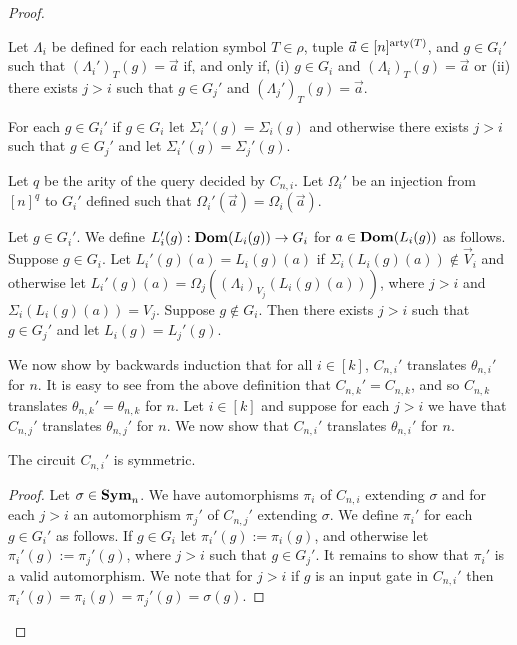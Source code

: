 \documentclass[../main/thesis.tex]{subfiles}
\begin{document}
\begin{proof}
\begin{myitemize}
  \item Let $\Lambda_i$ be defined for each relation symbol $T \in \rho$, tuple
    $\vec{a} \in [n]^{\mathrm{arty}(T)}$, and $g \in G_i'$ such that $(\Lambda_i')_{T}
    (g) = \vec{a}$ if, and only if, (i) $g \in G_i$ and $(\Lambda_i)_{T}(g) =
    \vec{a}$ or (ii) there exists $j > i$ such that $g \in G_j'$ and
    $(\Lambda_j')_T (g) = \vec{a}$.
    
  \item For each $g \in G_i'$ if $g \in G_i$ let $\Sigma_i' (g) = \Sigma_i (g)$
    and otherwise there exists $j > i$ such that $g \in G_j'$ and let $\Sigma_i'
    (g) = \Sigma_j' (g)$.
    
  \item Let $q$ be the arity of the query decided by $C_{n, i}$. Let $\Omega_i'$
    be an injection from $[n]^{q}$ to $G_i'$ defined such that $\Omega_i'
    (\vec{a}) = \Omega_i(\vec{a})$.
    
  \item Let $g \in G_i'$. We define $L_i' (g) : \text{\textbf{Dom}} (L_i(g)) \rightarrow G_i$ for $a
    \in \text{\textbf{Dom}}(L_i(g))$ as follows. Suppose $g \in G_i$. Let $L_i' (g)(a) =
    L_i(g)(a)$ if $\Sigma_i (L_i (g)(a)) \not\in \vec{V}_i$ and otherwise let
    $L_i'(g)(a) = \Omega_j((\Lambda_i)_{V_j}(L_i(g)(a)))$, where $j > i$ and
    $\Sigma_i (L_i (g)(a)) = V_j$. Suppose $g \not\in G_i$. Then there exists $j
    > i$ such that $g \in G_j'$ and let $L_i(g) = L_j'(g)$.
  \end{myitemize}
  
  We now show by backwards induction that for all $i \in [k]$, $C_{n, i}'$
  translates $\theta_{n, i}'$ for $n$. It is easy to see from the above
  definition that $C_{n, k}' = C_{n, k}$, and so $C_{n, k}$ translates
  $\theta_{n, k}' = \theta_{n, k}$ for $n$. Let $i \in [k]$ and suppose for each
  $j > i$ we have that $C_{n, j}'$ translates $\theta_{n, j}'$ for $n$. We now
  show that $C_{n, i}'$ translates $\theta_{n, i}'$ for $n$.

\begin{claim}
  The circuit $C_{n, i}'$ is symmetric.
\end{claim}
\begin{proof}
  Let $\sigma \in \text{\textbf{Sym}}_n$. We have automorphisms $\pi_i$ of $C_{n, i}$ extending
  $\sigma$ and for each $j > i$ an automorphism $\pi_j'$ of $C_{n, j}'$
  extending $\sigma$. We define $\pi_i'$ for each $g \in G_i'$ as follows. If $g
  \in G_i$ let $\pi_i' (g) := \pi_i (g)$, and otherwise let $\pi_i' (g) :=
  \pi_j' (g)$, where $j > i$ such that $g \in G_j'$. It remains to show that
  $\pi_i'$ is a valid automorphism. We note that for $j > i$ if $g$ is an input
  gate in $C_{n, i}'$ then $\pi_i' (g) = \pi_i (g) = \pi_j'(g) = \sigma(g)$.


\end{proof}
\end{proof}
\end{document}
